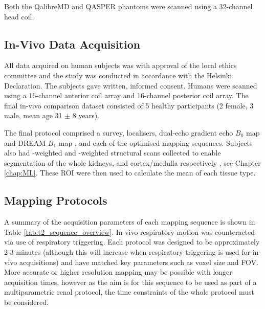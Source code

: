 Both the QalibreMD and \ac{QASPER} phantoms were scanned using a 32-channel head coil. 

\subsection{In-Vivo Data Acquisition}
All data acquired on human subjects was with approval of the local ethics committee and the study was conducted in accordance with the Helsinki Declaration. The subjects gave written, informed consent. Humans were scanned using a 16-channel anterior coil array and 16-channel posterior coil array. The final in-vivo comparison dataset consisted of 5 healthy participants (2 female, 3 male, mean age 31 $\pm$ 8 years).

The final protocol comprised a survey, localisers, dual-echo gradient echo $B_0$ map and \ac{DREAM} $B_1$ map \cite{nehrke_dreamnovel_2012}, and each of the optimised \ttwo mapping sequences. Subjects also had \ttwo-weighted and \tone-weighted structural scans collected to enable segmentation of the whole kidneys, and cortex/medulla respectively \cite{petzold_building_2014, will_automated_2014}, see Chapter \ref{chap:ML}. These \ac{ROI} were then used to calculate the mean \ttwo of each tissue type. 

\subsection{\ttwo Mapping Protocols}
\label{subsec:t2_acq_schemes}
A summary of the acquisition parameters of each \ttwo mapping sequence is shown in Table \ref{tab:t2_sequence_overview}. In-vivo respiratory motion was counteracted via use of respiratory triggering. Each protocol was designed to be  approximately 2-3 minutes (although this will increase when respiratory triggering is used for in-vivo acquisitions) and have matched key parameters such as voxel size and \ac{FOV}. More accurate or higher resolution \ttwo mapping may be possible with longer acquisition times, however as the aim is for this sequence to be used as part of a multiparametric renal protocol, the time constraints of the whole protocol must be considered. 

